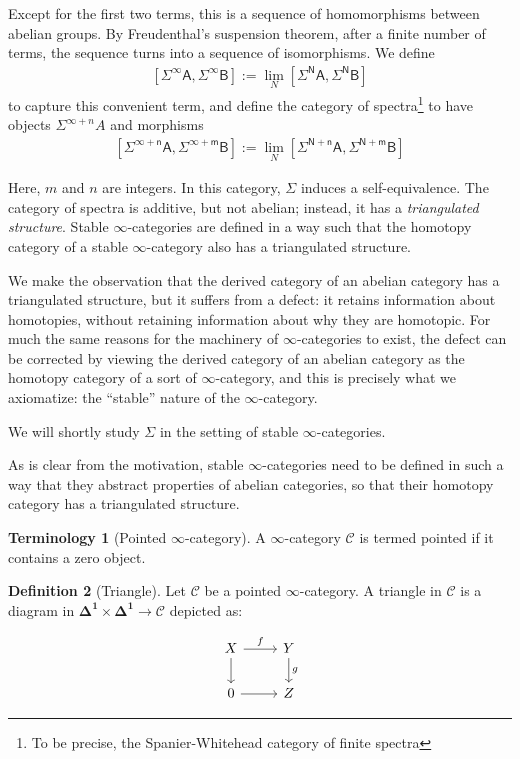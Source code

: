 \documentclass[10pt]{amsart}
\makeatletter
\newcommand{\8}{\ensuremath{\infty}}
\newcommand{\0}{\ensuremath{\overset{\rightarrow}{0}}}
\newcommand{\1}{\ensuremath{\mathbf{1}}}
\newcommand{\C}{\ensuremath{\mathscr{C}}}
\newcommand{\Simplex}[1]{\ensuremath{\boldsymbol{\Delta^{#1}}}}
\newcommand{\sq}[1]{\ensuremath{\mathsf{[#1]}}}
\theoremstyle{definition}
\newtheorem{definition}{Definition}[section]
\newtheorem{terminology}[definition]{Terminology}
\def\subsection{\@startsection{subsection}{2}
  \z@{.5\linespacing\@plus.7\linespacing}{.6\baselineskip}{\centering}}
\numberwithin{definition}{subsection}
\numberwithin{definition}{section}
\makeatother
\begin{document}
Except for the first two terms, this is a sequence of homomorphisms between abelian groups. By Freudenthal's suspension theorem, after a finite number of terms, the sequence turns into a sequence of isomorphisms. We define
\begin{align*}
  \sq{\Sigma^\infty A, \Sigma^\infty B} := \lim_N \sq{\Sigma^N A, \Sigma^N B}
\end{align*}
to capture this convenient term, and define the category of spectra\footnote{To be precise, the Spanier-Whitehead category of finite spectra} to have objects $\Sigma^{\infty + n} A$ and morphisms
\begin{align*}
  \sq{\Sigma^{\infty + n} A, \Sigma^{\infty + m} B} := \lim_N \sq{\Sigma^{N + n} A, \Sigma^{N + m} B}
\end{align*}

Here, $m$ and $n$ are integers. In this category, $\Sigma$ induces a self-equivalence. The category of spectra is additive, but not abelian; instead, it has a \emph{triangulated structure}. Stable \8-categories are defined in a way such that the homotopy category of a stable \8-category also has a triangulated structure.

We make the observation that the derived category of an abelian category has a triangulated structure, but it suffers from a defect: it retains information about homotopies, without retaining information about why they are homotopic. For much the same reasons for the machinery of \8-categories to exist, the defect can be corrected by viewing the derived category of an abelian category as the homotopy category of a sort of \8-category, and this is precisely what we axiomatize: the ``stable'' nature of the \8-category.

We will shortly study $\Sigma$ in the setting of stable \8-categories.

\subsection{Commentary on definition}
As is clear from the motivation, stable \8-categories need to be defined in such a way that they abstract properties of abelian categories, so that their homotopy category has a triangulated structure.

\begin{terminology}[Pointed \8-category]
  A \8-category $\C$ is termed pointed if it contains a zero object.
\end{terminology}

\begin{definition}[Triangle]
  Let $\C$ be a pointed \8-category. A triangle in $\C$ is a diagram in $\Simplex{1} \times \Simplex{1} \rightarrow \C$ depicted as:

  \begin{equation*}
    \begin{tikzcd}
      X \arrow[r, "f"] \arrow[d] & Y \arrow[d, "g"] \\
      0 \arrow[r] & Z
    \end{tikzcd}
  \end{equation*}
\end{definition}
\end{document}
